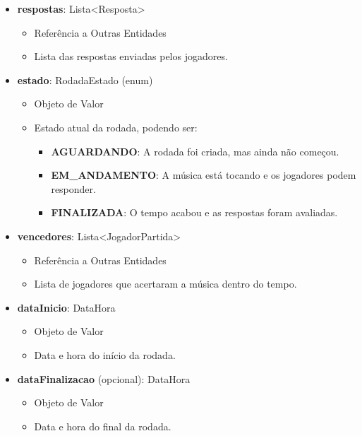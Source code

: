 \begin{itemize}
        \item \textbf{respostas}: Lista\textless Resposta\textgreater  
              \begin{itemize}
                  \item Referência a Outras Entidades
                  \item Lista das respostas enviadas pelos jogadores.
              \end{itemize}
    
        \item \textbf{estado}: RodadaEstado (enum)  
              \begin{itemize}
                  \item Objeto de Valor
                  \item Estado atual da rodada, podendo ser:
                  \begin{itemize}
                      \item \textbf{AGUARDANDO}: A rodada foi criada, mas ainda não começou.
                      \item \textbf{EM\_ANDAMENTO}: A música está tocando e os jogadores podem responder.
                      \item \textbf{FINALIZADA}: O tempo acabou e as respostas foram avaliadas.
                  \end{itemize}
              \end{itemize}
    
        \item \textbf{vencedores}: Lista\textless JogadorPartida\textgreater  
              \begin{itemize}
                  \item Referência a Outras Entidades
                  \item Lista de jogadores que acertaram a música dentro do tempo.
              \end{itemize}
    
        \item \textbf{dataInicio}: DataHora  
              \begin{itemize}
                  \item Objeto de Valor
                  \item Data e hora do início da rodada.
              \end{itemize}
    
        \item \textbf{dataFinalizacao} (opcional): DataHora  
              \begin{itemize}
                  \item Objeto de Valor
                  \item Data e hora do final da rodada.
              \end{itemize}
    \end{itemize}
